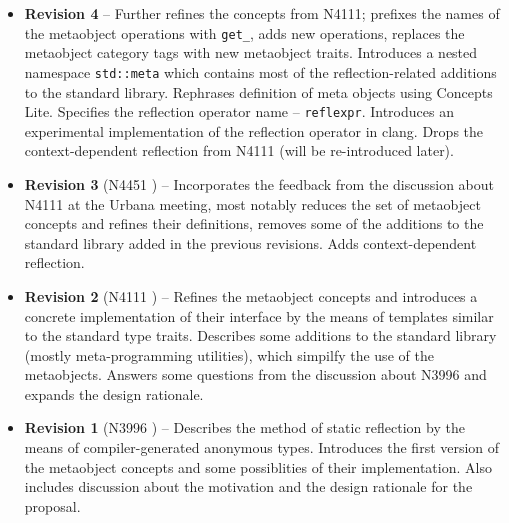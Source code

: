 \begin{itemize}
\item{\textbf{Revision 4}} -- Further refines the concepts from N4111; prefixes
the names of the metaobject operations with \texttt{get\_}, adds new operations,
replaces the metaobject category tags with new metaobject traits.
Introduces a nested namespace \texttt{std::meta} which contains most
of the reflection-related additions to the standard library.
Rephrases definition of meta objects using Concepts Lite. Specifies the
reflection operator name -- \texttt{reflexpr}.
Introduces an experimental implementation of the reflection operator in clang.
Drops the context-dependent reflection from N4111 (will be re-introduced later).

\item{\textbf{Revision 3} (N4451 \cite{n4451})} -- Incorporates the feedback from the discussion
about N4111 at the Urbana meeting, most notably reduces the set of metaobject concepts and refines their
definitions, removes some of the additions to the standard library added in the previous revisions.
Adds context-dependent reflection.

\item{\textbf{Revision 2} (N4111 \cite{n4111})} -- Refines the metaobject concepts and introduces
a concrete implementation of their interface by the means of templates similar
to the standard type traits. Describes some additions to the standard library
(mostly meta-programming utilities), which simpilfy the use of the metaobjects.
Answers some questions from the discussion about N3996 and expands the design
rationale.

\item{\textbf{Revision 1} (N3996 \cite{n3996})} -- Describes the method of static reflection
by the means of compiler-generated anonymous types. Introduces the first version
of the metaobject concepts and some possiblities of their implementation.
Also includes discussion about the motivation and the design rationale for the proposal.
\end{itemize}
